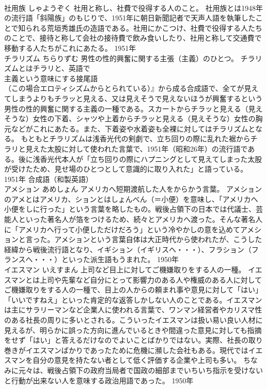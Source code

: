 \documentclass[8pt]{extreport}
\begin{document}
\begin{CJK}{UTF8}{min}
\\	社用族	しゃようぞく	社用と称し、社費で役得する人のこと。	社用族とは1948年の流行語「斜陽族」のもじりで、1951年に朝日新聞記者で天声人語を執筆したことで知られる荒垣秀雄氏の造語である。社用にかこつけ、社費で役得する人たちのことで、接待と称して会社の接待費で飲み食いしたり、社用と称して交通費で移動する人たちがこれにあたる。	1951年	
\\	チラリズム	ちらりずむ	男性の性的興奮に関する主張（主義）のひとつ。	チラリズムとはチラリと、英語で
\\	主義という意味にする接尾語
\\	（この場合エロティシズムからとられている）』から成る合成語で、全てが見えてしまうよりもチラッと見える、又は見えそうで見えないほうが興奮するという男性の性的興奮に関する主義の一種である。スカートからチラッと見える（見えそうな）女性の下着、シャツや上着からチラッと見える（見えそうな）女性の胸元などがこれにあたる。また、下着姿や水着姿も全裸に対してはチラリズムとなる。 もともとチラリズムは浅香光代の剣劇で、立ち回りの際に乱れた裾からチラリと見えた太股に対して使われた言葉で、1951年（昭和26年）の流行語である。後に浅香光代本人が「立ち回りの際にハプニングとして見えてしまった太股が受けたため、見せ場のひとつとして意識的に取り入れた」と語っている。	1951年	合成語（和製英語）	
\\	アメション	あめしょん	アメリカへ短期渡航した人をからかう言葉。	アメションのアメとはアメリカ、ションとはしょんべん（＝小便）を意味し、「アメリカへ小便をしに行った」という言葉を略したもの。戦後占領下の日本では代議士、芸能人といった著名人が箔をつけるため、続々とアメリカへ渡った。そんな著名人に「アメリカへ行って小便しただけだろう」という冷やかしの意を込めてアメションと言った。アメションという言葉自体は大正時代から使われたが、こうした経緯から戦後流行語となり、イギション（イギリスへ・・・）、フラション（フランスへ・・・）といった派生語もうまれた。	1950年	
\\	イエスマン	いえすまん	上司など目上に対してご機嫌取りをする人の一種。	イエスマンとは上司や先輩など自分にとって影響力のある人や権威のある人に対してご機嫌取りをする人の一種で、目上の人からの頼まれ事や意見に対して「はい」「いいですねえ」といった肯定的な返答しかしない人のことである。イエスマンは主にサラリーマンなど企業人に使われる言葉で、ワンマン経営者やカリスマ性のある社長の周りに多いとされる。こういったイエスマンは扱い易い良い人材に見えるが、明らかに誤った方向に進んでいるときや間違った意見に対しても指摘をせず「はい」と答えるだけなのでよいことばかりではない。実際、社長の取り巻きがイエスマンばかりであったために危機に瀕した会社もある。現代ではイエスマンを自分の意見を持たない者として低く評価する企業や上司も多い。 ちなみに元々は、戦後占領下の政府当局者で国政の細部までいちいち指示を受けないと行動が出来ない人を意味する政治用語であった。	1950年	

\end{CJK}
\end{document}

